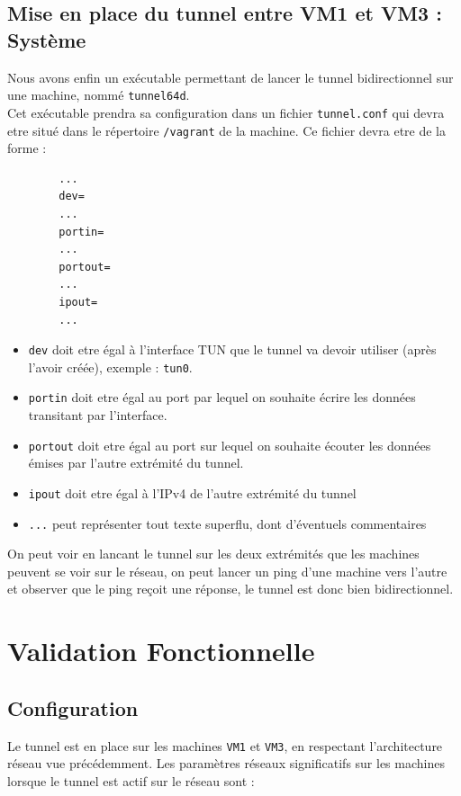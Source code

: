 \documentclass[a4paper, 10pt]{article}
\begin{document}
    \newpage
    \subsection{Mise en place du tunnel entre VM1 et VM3 : Système}
      Nous avons enfin un exécutable permettant de lancer le tunnel
      bidirectionnel sur une machine, nommé \verb+tunnel64d+. \\

      Cet exécutable prendra sa configuration dans un fichier \verb+tunnel.conf+
      qui devra etre situé dans le répertoire \verb+/vagrant+ de la machine. Ce
      fichier devra etre de la forme :
      \begin{verbatim}
        ...
        dev=
        ...
        portin=
        ...
        portout=
        ...
        ipout=
        ...
      \end{verbatim}

      \begin{itemize}
        \item \verb+dev+ doit etre égal à l'interface TUN que le tunnel va
              devoir utiliser (après l'avoir créée), exemple : \verb+tun0+.
        \item \verb+portin+ doit etre égal au port par lequel on souhaite écrire
              les données transitant par l'interface.
        \item \verb+portout+ doit etre égal au port sur lequel on souhaite
              écouter les données émises par l'autre extrémité du tunnel.
        \item \verb+ipout+ doit etre égal à l'IPv4 de l'autre extrémité du
              tunnel
        \item \verb+...+ peut représenter tout texte superflu, dont d'éventuels
              commentaires \\
      \end{itemize}

      On peut voir en lancant le tunnel sur les deux extrémités que les machines
      peuvent se voir sur le réseau, on peut lancer un ping d'une machine vers
      l'autre et observer que le ping reçoit une réponse, le tunnel est donc
      bien bidirectionnel.

  \section{Validation Fonctionnelle}
    \subsection{Configuration}
      Le tunnel est en place sur les machines \verb+VM1+ et \verb+VM3+, en
      respectant l'architecture réseau vue précédemment. Les paramètres réseaux
      significatifs sur les machines lorsque le tunnel est actif sur le réseau
      sont :
\end{document}
